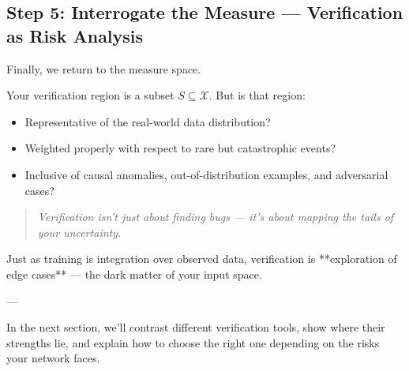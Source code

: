 \subsection{Step 5: Interrogate the Measure — Verification as Risk Analysis}

Finally, we return to the measure space.

Your verification region is a subset \( S \subseteq \mathcal{X} \).  
But is that region:
\begin{itemize}
  \item Representative of the real-world data distribution?
  \item Weighted properly with respect to rare but catastrophic events?
  \item Inclusive of causal anomalies, out-of-distribution examples, and adversarial cases?
\end{itemize}

\begin{quote}
\textit{Verification isn’t just about finding bugs — it’s about mapping the tails of your uncertainty.}
\end{quote}

Just as training is integration over observed data, verification is **exploration of edge cases** — the dark matter of your input space.

---

\vspace{1em}
\noindent
In the next section, we’ll contrast different verification tools, show where their strengths lie, and explain how to choose the right one depending on the risks your network faces.

